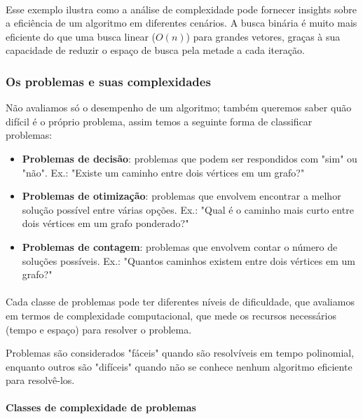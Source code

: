 \documentclass[12pt,a4paper]{article}
\def\emph#1{#1}%
\begin{document}
\paragraph{}
Esse exemplo ilustra como a análise de complexidade pode fornecer insights sobre a eficiência de um algoritmo em diferentes cenários. A busca binária é muito mais eficiente do que uma busca linear (\(O(n)\)) para grandes vetores, graças à sua capacidade de reduzir o espaço de busca pela metade a cada iteração.

\subsubsection{Os problemas e suas complexidades}

Não avaliamos só o desempenho de \emph{um algoritmo}; também queremos saber \emph{quão difícil é o próprio problema}, assim temos  a seguinte forma de classificar problemas:    
\begin{itemize}\setlength{\itemsep}{2pt}
    \item \textbf{Problemas de decisão}: problemas que podem ser respondidos com "sim" ou "não". Ex.: "Existe um caminho entre dois vértices em um grafo?"
    \item \textbf{Problemas de otimização}: problemas que envolvem encontrar a melhor solução possível entre várias opções. Ex.: "Qual é o caminho mais curto entre dois vértices em um grafo ponderado?"
    \item \textbf{Problemas de contagem}: problemas que envolvem contar o número de soluções possíveis. Ex.: "Quantos caminhos existem entre dois vértices em um grafo?"
\end{itemize}

\paragraph{}
Cada classe de problemas pode ter diferentes níveis de dificuldade, que avaliamos em termos de \emph{complexidade computacional}, que mede os recursos necessários (tempo e espaço) para resolver o problema.

Problemas são considerados "fáceis" quando são resolvíveis em tempo polinomial, enquanto outros são "difíceis" quando não se conhece nenhum algoritmo eficiente para resolvê-los.

\paragraph{Classes de complexidade de problemas}
\end{document}
